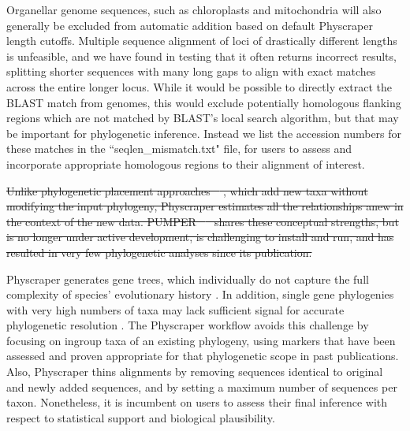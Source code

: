 \documentclass{bmcart}
\providecommand{\DIFdeltex}[1]{{\protect\color{red}\sout{#1}}}                      %
\providecommand{\DIFdelbegin}{} %
\providecommand{\DIFdelend}{} %
\providecommand{\DIFdel}[1]{\texorpdfstring{\DIFdeltex{#1}}{}} %
\begin{document}
Organellar genome sequences, such as chloroplasts and mitochondria will also generally
be excluded from automatic addition based on default Physcraper length cutoffs.
Multiple sequence alignment of loci of drastically different lengths is unfeasible,
and we have found in testing that it often returns incorrect results, splitting
shorter sequences with many long gaps to align with exact matches across the entire
longer locus.
While it would be possible to directly extract the BLAST match from genomes, this
 would exclude potentially homologous flanking regions which are not matched
by BLAST's local search algorithm, but that may be important for phylogenetic inference.
Instead we list the accession numbers for these matches in the ``seqlen\_mismatch.txt"
file, for users to assess and incorporate appropriate homologous regions to their
alignment of interest.

\DIFdelbegin \DIFdel{Unlike phylogenetic placement approaches \mbox{%
\cite{berger_performance_2011, matsen_pplacer_2010}}\hspace{0pt}%
,
which add new taxa without modifying the input phylogeny, Physcraper estimates all
the relationships anew in the context of the new data.
PUMPER \mbox{%
\cite{izquierdo2014pumper} }\hspace{0pt}%
shares these conceptual strengths, but is no
longer under active development, is challenging to install and run, and has resulted
in very few phylogenetic analyses since its publication.
}%

\DIFdelend Physcraper generates gene trees, which individually do not capture the full complexity
of species' evolutionary history \cite{song2012resolving}. In addition, single gene
phylogenies with very high numbers of taxa may lack sufficient signal
for accurate phylogenetic resolution \cite{morel_phylogenetic_2020}.
The Physcraper workflow avoids this challenge by focusing on ingroup
taxa of an existing phylogeny, using markers that have been assessed and proven
appropriate for that phylogenetic scope in past publications.
Also, Physcraper thins alignments by removing sequences identical to original
and newly added sequences, and by setting a maximum number of sequences per taxon.
Nonetheless, it is incumbent on users to assess their final inference with respect
to statistical support and biological plausibility.
\end{document}
